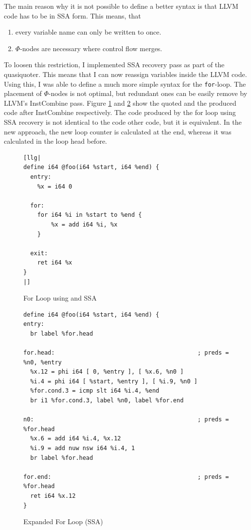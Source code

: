 \documentclass[a4paper,bibliography=totocnumbered,parskip,headsepline]{scrbook}
\begin{document}
The main reason why it is not possible to define a better syntax is that LLVM code has to be in SSA form.
This means, that
\begin{enumerate}[noitemsep]
 \item every variable name can only be written to once.
 \item $\Phi$-nodes are necessary where control flow merges.
\end{enumerate}

To loosen this restriction, I implemented SSA recovery pass as part of the quasiquoter.
This means that I can now reassign variables inside the LLVM code.
Using this, I was able to define a much more simple syntax for the \lstinline{for}-loop.
The placement of $\Phi$-nodes is not optimal, but redundant ones can be easily remove by LLVM's InstCombine pass.
Figure \ref{fig:forquoteSSA} and \ref{fig:forquoteSSA1} show the quoted and the produced code after InstCombine respectively.
The code produced by the for loop using SSA recovery is not identical to the code other code, but it is equivalent.
In the new approach, the new loop counter is calculated at the end, whereas it was calculated in the loop head before.

\begin{figure}
\begin{lstlisting}
[llg|
define i64 @foo(i64 %start, i64 %end) {
  entry:
    %x = i64 0

  for:
    for i64 %i in %start to %end {
        %x = add i64 %i, %x
    }

  exit:
    ret i64 %x
}
|]
\end{lstlisting}
\caption{For Loop using  and SSA}
\label{fig:forquoteSSA}
\end{figure}

\begin{figure}
\begin{lstlisting}
define i64 @foo(i64 %start, i64 %end) {
entry:
  br label %for.head

for.head:                                         ; preds = %n0, %entry
  %x.12 = phi i64 [ 0, %entry ], [ %x.6, %n0 ]
  %i.4 = phi i64 [ %start, %entry ], [ %i.9, %n0 ]
  %for.cond.3 = icmp slt i64 %i.4, %end
  br i1 %for.cond.3, label %n0, label %for.end

n0:                                               ; preds = %for.head
  %x.6 = add i64 %i.4, %x.12
  %i.9 = add nuw nsw i64 %i.4, 1
  br label %for.head

for.end:                                          ; preds = %for.head
  ret i64 %x.12
}
\end{lstlisting}
\caption{Expanded For Loop (SSA)}
\label{fig:forquoteSSA1}
\end{figure}
\end{document}

